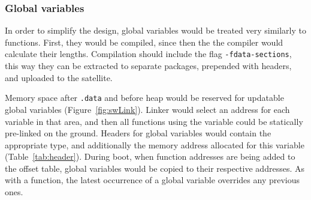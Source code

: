 \subsubsection{Global variables}

In order to simplify the design, global variables would be treated very similarly to functions. First, they would be compiled, since then the the compiler would calculate their lengths. Compilation should include the flag \texttt{-fdata-sections}, this way they can be extracted to separate packages, prepended with headers, and uploaded to the satellite.

Memory space after \texttt{.data} and before heap would be reserved for updatable global variables  (Figure~\ref{fig:swLink}). Linker would select an address for each variable in that area, and then all functions using the variable could be statically pre-linked on the ground. Headers for global variables would contain the appropriate type, and additionally the memory address allocated for this variable (Table~\ref{tab:header}). During boot, when function addresses are being added to the offset table, global variables would be copied to their respective addresses. As with a function, the latest occurrence of a global variable overrides any previous ones.
